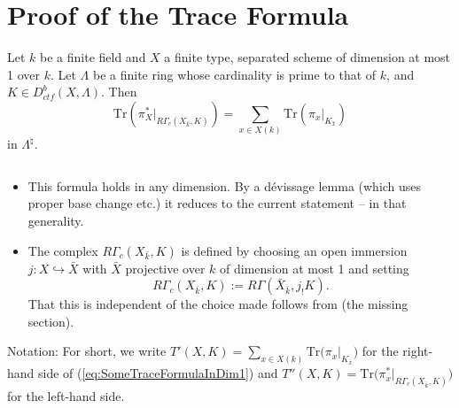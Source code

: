 
\section{Proof of the Trace Formula}

\begin{theorem} \label{thm:SomeTraceFormulaInDim1}
Let $k$ be a finite field and $X$ a finite type, separated scheme of dimension
at most 1 over $k$. Let $\Lambda$ be a finite ring whose cardinality is prime
to that of $k$, and $K\in D_{ctf}^b(X, \Lambda)$. Then
\begin{equation} \label{eq:SomeTraceFormulaInDim1}
\text{Tr}\left(\pi_X^*\big|_{R\Gamma_c(X_{\bar k}, K)}\right) = \sum_{x\in
X(k)} \text{Tr}\left(\pi_x\big|_{K_{\bar x}}\right)
\end{equation}
in $\Lambda^{\natural}$.
\end{theorem}

\begin{remark} $ $
\begin{itemize}
\item
This formula holds in any dimension. By a d\'evissage lemma (which uses proper
base change etc.) it reduces to the current statement -- in that generality.
\item
The complex $R\Gamma_c(X_{\bar k}, K)$ is defined by choosing an open immersion
$j: X \hookrightarrow \bar X$ with $\bar X$ projective over $k$ of dimension at
most 1 and setting
$$
R\Gamma_c(X_{\bar k}, K) := R\Gamma(\bar X_{\bar k}, j_!K).
$$
That this is independent of the choice made follows from (the missing section).
\end{itemize}
\end{remark}

Notation:
For short, we write $T'(X, K) = \sum_{x\in X(k)}
\text{Tr}\big(\pi_x\big|_{K_{\bar x}}\big)$ for the right-hand side of
(\ref{eq:SomeTraceFormulaInDim1}) and $T''(X, K)
=\text{Tr}\big(\pi_x^*\big|_{R\Gamma_c(X_{\bar k}, K)}\big)$ for the left-hand
side.


